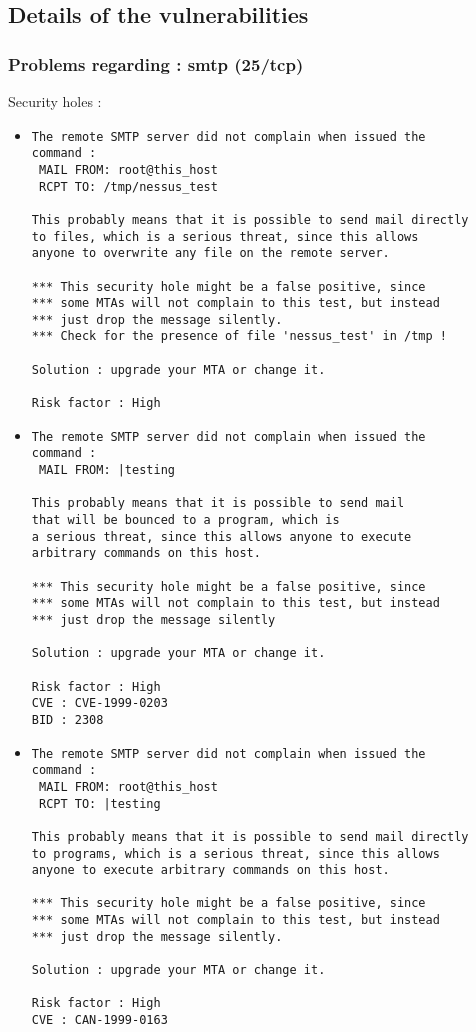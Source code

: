 \documentclass{article}
\begin{document}
\subsection{Details of the vulnerabilities}
\subsubsection{Problems regarding : smtp (25/tcp)}
Security holes :\\
\begin{itemize}
\item \begin{verbatim}
The remote SMTP server did not complain when issued the
command :
 MAIL FROM: root@this_host
 RCPT TO: /tmp/nessus_test
 
This probably means that it is possible to send mail directly
to files, which is a serious threat, since this allows
anyone to overwrite any file on the remote server.

*** This security hole might be a false positive, since
*** some MTAs will not complain to this test, but instead
*** just drop the message silently.
*** Check for the presence of file 'nessus_test' in /tmp !
   
Solution : upgrade your MTA or change it.

Risk factor : High
\end{verbatim}\item \begin{verbatim}
The remote SMTP server did not complain when issued the
command :
 MAIL FROM: |testing
 
This probably means that it is possible to send mail 
that will be bounced to a program, which is 
a serious threat, since this allows anyone to execute 
arbitrary commands on this host.

*** This security hole might be a false positive, since
*** some MTAs will not complain to this test, but instead
*** just drop the message silently
   
Solution : upgrade your MTA or change it.

Risk factor : High
CVE : CVE-1999-0203
BID : 2308
\end{verbatim}\item \begin{verbatim}
The remote SMTP server did not complain when issued the
command :
 MAIL FROM: root@this_host
 RCPT TO: |testing
 
This probably means that it is possible to send mail directly
to programs, which is a serious threat, since this allows
anyone to execute arbitrary commands on this host.

*** This security hole might be a false positive, since
*** some MTAs will not complain to this test, but instead
*** just drop the message silently.
   
Solution : upgrade your MTA or change it.

Risk factor : High
CVE : CAN-1999-0163
\end{verbatim}\end{itemize}
\end{document}
